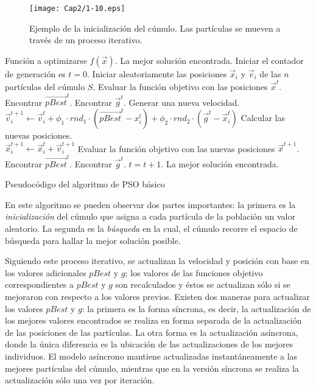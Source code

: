      \begin{figure}
	\centering
	\texttt{[image: Cap2/1-10.eps]}
	  \caption[Ejemplo de la inicializaci\'on del c\'umulo]{Ejemplo de la inicializaci\'on del c\'umulo. Las part\'iculas se mueven 
	  a trav\'es de un proceso iterativo.}
      \label{fig:iniciacion}
      \end{figure}
    
    \begin{algorithm}
    \begin{algorithmic}[1]
	\REQUIRE Funci\'on a optimizarse $f\left(\vec{x}\right)$.
	\ENSURE La mejor soluci\'on encontrada.
	\STATE Iniciar el contador de generaci\'on es $t=0$.
	\STATE Iniciar aleatoriamente las posiciones $\vec{x}_i$ y $\vec{v}_i$ de las $n$ part\'iculas del c\'umulo $S$.
	\STATE Evaluar la funci\'on objetivo con las posiciones $\vec{x}^{t}$.
	\STATE Encontrar $\vec{pBest}^t$. 
	\STATE Encontrar $\vec{g}^t$.
		  \STATE Generar una nueva velocidad.
		  \\ $\vec{v}^{t+1}_{i}\leftarrow \vec{v}^{t}_{i}+\phi_{1}\cdot rnd_{1} \cdot \left(\vec{pBest}^{t}-x^{t}_{i}\right) 
				            +\phi_{2}\cdot rnd_{2} \cdot \left(\vec{g}^{t}-\vec{x}^{t}_{i}\right)$
		  \STATE Calcular las nuevas posiciones. 
		  \\$\vec{x}^{t+1}_{i} \leftarrow \vec{x}^{t}_{i}+\vec{v}^{t+1}_{i}$
		  \STATE Evaluar la funci\'on objetivo con las nuevas posiciones $\vec{x}^{t+1}$.
		\ENDFOR
		\STATE Encontrar $\vec{pBest}^t$. 
		\STATE Encontrar $\vec{g}^t$.
		\STATE $t=t+1$.
	\ENDWHILE
	\RETURN La mejor soluci\'on encontrada.
	\end{algorithmic}
	\caption{Pseudoc\'odigo del algoritmo de PSO b\'asico}
	\label{alg:PSO}
	\end{algorithm}

	En este algoritmo se pueden observar dos partes importantes: la primera es la \textit{inicializaci\'on} del c\'umulo que asigna a cada 
	part\'icula de la poblaci\'on un valor aleatorio. La segunda es la \textit{b\'usqueda} en la cual, el c\'umulo recorre el espacio
	de b\'usqueda para hallar la mejor soluci\'on posible. 
	
	Siguiendo este proceso iterativo, se actualizan la velocidad y posici\'on con base en los valores adicionales $pBest$ y $g$; los  
	valores de las funciones objetivo correspondientes a $pBest$ y $g$ son recalculados y \'estos se actualizan s\'olo si se mejoraron 
	con respecto a los valores previos. Existen dos maneras para actualizar los valores $pBest$ y $g$: la primera es la forma s\'incrona, es 
	decir, la actualizaci\'on de los mejores valores encontrados se realiza en forma 
	separada de la actualizaci\'on de las posiciones de las part\'iculas. La otra forma es la actualizaci\'on as\'incrona, donde la \'unica 
	diferencia es la ubicaci\'on de las actualizaciones de los mejores individuos. El modelo as\'incrono mantiene actualizadas 
	instant\'aneamente a las mejores part\'iculas del c\'umulo, mientras que en la versi\'on s\'incrona se realiza la actualizaci\'on s\'olo 
	una vez por iteraci\'on.
    

